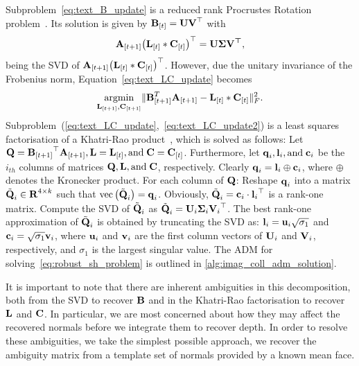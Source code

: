 { %
\def\t#1{{\bb{#1}_{[t]}}}
\def\tp#1{{\bb{#1}_{[t+1]}}}
\noindent Subproblem~\eqref{eq:text_B_update} is a reduced rank Procrustes
Rotation problem~\cite{zou2006sparse}. Its solution is given by
$\boldsymbol{\mathbf{B}}_{[t]} = \boldsymbol{\mathbf{U}} \boldsymbol{\mathbf{V}}^{\top}$ with
\begin{equation}\label{eq:text_B_update2}
    \tp A {\left(\t L \ast \t C\right)}^{\top} = \bb{U} \bb{\Sigma} \bb{V^{\top}},
\end{equation} 
being the SVD of $\tp A {\left(\t L \ast \t C\right)}^{\top}$. However, due the
unitary invariance of the Frobenius norm, Equation~\ref{eq:text_LC_update}
becomes
\begin{equation}\label{eq:text_LC_update2}
    \argmin_{\bb{L}_{[t+1]}, \bb{C}_{[t+1]}} \lVert \bb{B}_{[t+1]}^T\bb{A}_{[t+1]} - \bb{L}_{[t]} \ast \bb{C}_{[t]} \rVert_{F}^{2}.
\end{equation}
Subproblem~(\ref{eq:text_LC_update},~\ref{eq:text_LC_update2}) is a least 
squares factorisation of a Khatri-Rao product~\cite{roemer2010tensor}, which is 
solved as follows:
Let $\bb{Q} = \tp B^{\top} \tp A, \bb{L} = \t L, \text{and} \; \bb{C} = \t C$. 
Furthermore, let $\boldsymbol{\mathbf{q}}_i, \boldsymbol{\mathbf{l}}_i, \text{and} \; \boldsymbol{\mathbf{c}}_i$ be the $i_{th}$ 
columns of 
matrices $\boldsymbol{\mathbf{Q}}, \boldsymbol{\mathbf{L}}, \text{and} \; \boldsymbol{\mathbf{C}}$, respectively. 
Clearly $\boldsymbol{\mathbf{q}}_i = \boldsymbol{\mathbf{l}}_i \oplus \boldsymbol{\mathbf{c}}_i$, where $\oplus$ denotes the Kronecker 
product. For each column of $\boldsymbol{\mathbf{Q}}$: Reshape $\boldsymbol{\mathbf{q}}_i$ into a 
matrix $\tilde{\boldsymbol{\mathbf{Q}}}_i \in \boldsymbol{\mathbf{R}}^{4 \times k}$ 
such that 
$\text{vec}\left(\tilde{\boldsymbol{\mathbf{Q}}}_i\right) = \boldsymbol{\mathbf{q}}_i$. 
Obviously, $\tilde{\boldsymbol{\mathbf{Q}}}_i = \boldsymbol{\mathbf{c}}_i \cdot {\boldsymbol{\mathbf{l}}_i}^{\top}$ is a rank-one matrix.
Compute the SVD of
$\tilde{\boldsymbol{\mathbf{Q}}}_i$ as $\tilde{\boldsymbol{\mathbf{Q}}}_i = \boldsymbol{\mathbf{U}}_i \boldsymbol{\mathbf{\Sigma}}_i {\boldsymbol{\mathbf{V}}_i}^{\top}$. 
The best rank-one approximation of $\tilde{\boldsymbol{\mathbf{Q}}}_i$ is obtained by truncating the SVD as:
$\boldsymbol{\mathbf{l}}_i = \boldsymbol{\mathbf{u}}_i \sqrt{\sigma_1}$ and $\boldsymbol{\mathbf{c}}_i = \sqrt{\sigma_1} \boldsymbol{\mathbf{v}}_i$,
where $\boldsymbol{\mathbf{u}}_i$ and $\boldsymbol{\mathbf{v}}_i$ are the first column vectors of $\boldsymbol{\mathbf{U}}_i$
and $\boldsymbol{\mathbf{V}}_i$, respectively, and $\sigma_1$ is the largest singular value.
The ADM for solving~\eqref{eq:robust_sh_problem} is outlined in 
\cref{alg:imag_coll_adm_solution}.
}

It is important to note that there are inherent ambiguities in this
decomposition, both from the SVD to recover $\boldsymbol{\mathbf{B}}$ and in the Khatri-Rao
factorisation to recover $\boldsymbol{\mathbf{L}}$ and $\boldsymbol{\mathbf{C}}$. In particular, we are most
concerned about how they may affect the recovered normals before we integrate
them to recover depth. In order to resolve these ambiguities, we take the
simplest possible approach, we recover the ambiguity matrix from a template set
of normals provided by a known mean face.

